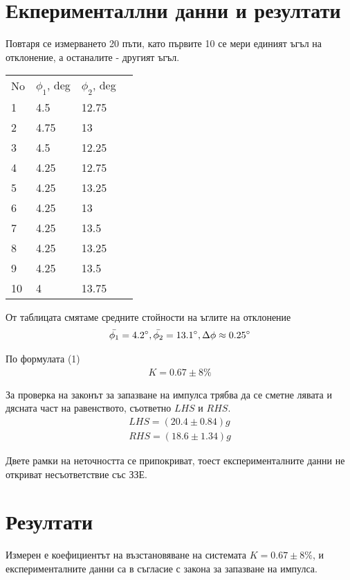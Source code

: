 \documentclass[aps, prb, twocolumn, a4paper]{revtex4-2}
\begin{document}
\section{Екперименталлни данни и резултати}
Повтаря се измерването 20 пъти, като първите 10 се мери единият ъгъл на отклонение, а останалите - другият ъгъл.
\begin{table}[ht]
\begin{tabular}{llll}
No & $\phi_1$, deg & $\phi_2$, deg &  \\
1  & 4.5                    & 12.75                  &  \\
2  & 4.75                   & 13                     &  \\
3  & 4.5                    & 12.25                  &  \\
4  & 4.25                   & 12.75                  &  \\
5  & 4.25                   & 13.25                  &  \\
6  & 4.25                   & 13                     &  \\
7  & 4.25                   & 13.5                   &  \\
8  & 4.25                   & 13.25                  &  \\
9  & 4.25                   & 13.5                   &  \\
10 & 4                      & 13.75                  & 
\end{tabular}
\end{table}
От таблицата смятаме средните стойности на ъглите на отклонение
\begin{gather*}
    \bar{\phi_1} = 4.2 \degree, \bar{\phi_2} = 13.1 \degree, \Delta \phi \approx 0.25 \degree
\end{gather*}

По формулата (1) 
\begin{gather*}
    K = 0.67 \pm 8 \%
\end{gather*}

За проверка на законът за запазване на импулса трябва да се сметне лявата и дясната част на равенството, съответно $LHS$ и $RHS$.
\begin{gather*}
    LHS = (20.4 \pm 0.84) g \\
    RHS = (18.6 \pm 1.34) g
\end{gather*}

Двете рамки на неточността се припокриват, тоест експерименталните данни не откриват несъответствие със ЗЗЕ.

\section{Резултати}

Измерен е коефициентът на възстановяване на системата $K = 0.67 \pm 8\%$, и експерименталните данни са в съгласие с закона за запазване на импулса. 
\end{document}
